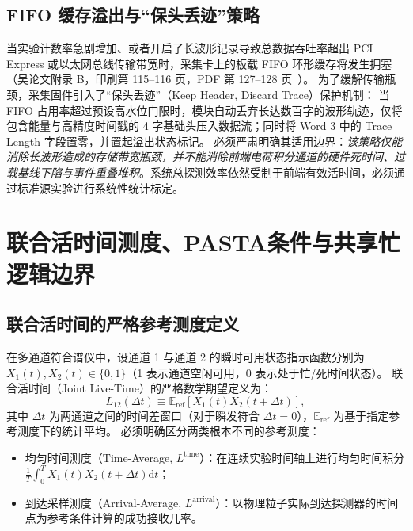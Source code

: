 \subsection{FIFO 缓存溢出与“保头丢迹”策略}

当实验计数率急剧增加、或者开启了长波形记录导致总数据吞吐率超出 PCI Express 或以太网总线传输带宽时，采集卡上的板载 FIFO 环形缓存将发生拥塞（吴论文附录 B，印刷第 115–116 页，PDF 第 127–128 页~\cite{wu-hongyi-2020-general-purpose-digital-daq-thesis}）。
为了缓解传输瓶颈，采集固件引入了“保头丢迹”（Keep Header, Discard Trace）保护机制：
当 FIFO 占用率超过预设高水位门限时，模块自动丢弃长达数百字的波形轨迹，仅将包含能量与高精度时间戳的 4 字基础头压入数据流；同时将 Word 3 中的 Trace Length 字段置零，并置起溢出状态标记。
必须严肃明确其适用边界：\emph{该策略仅能消除长波形造成的存储带宽瓶颈，并不能消除前端电荷积分通道的硬件死时间、过载基线下陷与事件重叠堆积}。系统总探测效率依然受制于前端有效活时间，必须通过标准源实验进行系统性统计标定。

\section{联合活时间测度、PASTA条件与共享忙逻辑边界}\label{sec:appE-joint-live}

\subsection{联合活时间的严格参考测度定义}

在多通道符合谱仪中，设通道 1 与通道 2 的瞬时可用状态指示函数分别为 $X_1(t), X_2(t) \in \{0, 1\}$（1 表示通道空闲可用，0 表示处于忙/死时间状态）。
联合活时间（Joint Live-Time）的严格数学期望定义为：
\begin{equation}\label{eq:appE-joint-live-def}
L_{12}(\Delta t) \equiv \mathbb{E}_{\mathrm{ref}}\left[ X_1(t) X_2(t + \Delta t) \right],
\end{equation}
其中 $\Delta t$ 为两通道之间的时间差窗口（对于瞬发符合 $\Delta t = 0$），$\mathbb{E}_{\mathrm{ref}}$ 为基于指定参考测度下的统计平均。
必须明确区分两类根本不同的参考测度：
\begin{itemize}
\item 均匀时间测度（Time-Average, $L^{\mathrm{time}}$）：在连续实验时间轴上进行均匀时间积分 $\frac{1}{T} \int_0^T X_1(t) X_2(t + \Delta t) \mathrm{d}t$；
\item 到达采样测度（Arrival-Average, $L^{\mathrm{arrival}}$）：以物理粒子实际到达探测器的时间点为参考条件计算的成功接收几率。
\end{itemize}


